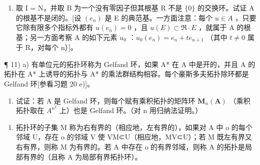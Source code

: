 \begin{enumerate}
\def\labelenumi{\alph{enumi})}
\setcounter{enumi}{1}
\tightlist
\item
  取 I = N，并取 B 为一个没有零因子但其根基 R 不是 \(\{0\}\) 的交换环。试证 A 的根基不是闭的。{[}设 \((e_{n})\) 是 E 的典范基。一方面注意：每个 \(u \in A\) ，只要它除有限多个指标外都有 \(u(e_{n}) = 0\) ，且 \(u(E) \subset \Re \cdot E\) ，就属于 A 的根基；另一方面考察 A 的如下元素 \(u_{0}\) ：\(u_{0}(e_{n}) = e_{n} + te_{n+1}\) （其中 \(t \neq 0\) 属于 R，对每个 n）{]}。
\end{enumerate}

¶ 11) a) 有单位元的拓扑环称为 Gelfand 环，如果 A* 在 A 中是开的，并且 A 的拓扑在 A* 上诱导的拓扑与 A* 的乘法群结构相容。每个豪斯多夫拓扑除环都是 Gelfand 环{[}参看习题 20 e){]}。

\begin{enumerate}
\def\labelenumi{\alph{enumi})}
\setcounter{enumi}{1}
\tightlist
\item
  试证：若 A 是 Gelfand 环，则每个赋有乘积拓扑的矩阵环 \(\mathbf{M}_{n}(\mathbf{A})\) （乘积拓扑取在 \(A^{n^{2}}\) 上）也是 Gelfand 环。（对 n 用归纳法证明。）
\end{enumerate}

\begin{enumerate}
\def\labelenumi{\arabic{enumi})}
\setcounter{enumi}{11}
\tightlist
\item
  拓扑环的子集 M 称为右有界的（相应地，左有界的），如果对 A 中 o 的每个邻域 U，存在 o 的邻域 V 使 VM⊂U（相应地，MV⊂U）；若 M 既左有界又右有界，则称 M 为有界的。若 A 中存在 o 的有界邻域，则称 A 的拓扑是局部有界的（且称 A 为局部有界拓扑环）。
\end{enumerate}

